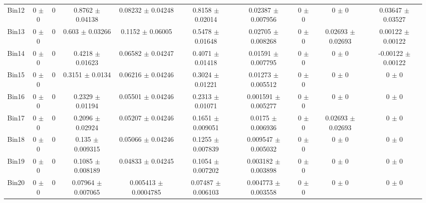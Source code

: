 \begin{tabular}{@{\extracolsep{4pt}}lccccccccc@{}}
     Bin12 & 0 $\pm$ 0 & 0 & 0.8762 $\pm$ 0.04138 & 0.08232 $\pm$ 0.04248 & 0.8158 $\pm$ 0.02014 & 0.02387 $\pm$ 0.007956 & 0 $\pm$ 0 & 0 $\pm$ 0 & 0.03647 $\pm$ 0.03527 \\ 
     Bin13 & 0 $\pm$ 0 & 0 & 0.603 $\pm$ 0.03266 & 0.1152 $\pm$ 0.06005 & 0.5478 $\pm$ 0.01648 & 0.02705 $\pm$ 0.008268 & 0 $\pm$ 0 & 0.02693 $\pm$ 0.02693 & 0.00122 $\pm$ 0.00122 \\ 
     Bin14 & 0 $\pm$ 0 & 0 & 0.4218 $\pm$ 0.01623 & 0.06582 $\pm$ 0.04247 & 0.4071 $\pm$ 0.01418 & 0.01591 $\pm$ 0.007795 & 0 $\pm$ 0 & 0 $\pm$ 0 & -0.00122 $\pm$ 0.00122 \\ 
     Bin15 & 0 $\pm$ 0 & 0 & 0.3151 $\pm$ 0.0134 & 0.06216 $\pm$ 0.04246 & 0.3024 $\pm$ 0.01221 & 0.01273 $\pm$ 0.005512 & 0 $\pm$ 0 & 0 $\pm$ 0 & 0 $\pm$ 0 \\ 
     Bin16 & 0 $\pm$ 0 & 0 & 0.2329 $\pm$ 0.01194 & 0.05501 $\pm$ 0.04246 & 0.2313 $\pm$ 0.01071 & 0.001591 $\pm$ 0.005277 & 0 $\pm$ 0 & 0 $\pm$ 0 & 0 $\pm$ 0 \\ 
     Bin17 & 0 $\pm$ 0 & 0 & 0.2096 $\pm$ 0.02924 & 0.05207 $\pm$ 0.04246 & 0.1651 $\pm$ 0.009051 & 0.0175 $\pm$ 0.006936 & 0 $\pm$ 0 & 0.02693 $\pm$ 0.02693 & 0 $\pm$ 0 \\ 
     Bin18 & 0 $\pm$ 0 & 0 & 0.135 $\pm$ 0.009315 & 0.05066 $\pm$ 0.04246 & 0.1255 $\pm$ 0.007839 & 0.009547 $\pm$ 0.005032 & 0 $\pm$ 0 & 0 $\pm$ 0 & 0 $\pm$ 0 \\ 
     Bin19 & 0 $\pm$ 0 & 0 & 0.1085 $\pm$ 0.008189 & 0.04833 $\pm$ 0.04245 & 0.1054 $\pm$ 0.007202 & 0.003182 $\pm$ 0.003898 & 0 $\pm$ 0 & 0 $\pm$ 0 & 0 $\pm$ 0 \\ 
     Bin20 & 0 $\pm$ 0 & 0 & 0.07964 $\pm$ 0.007065 & 0.005413 $\pm$ 0.0004785 & 0.07487 $\pm$ 0.006103 & 0.004773 $\pm$ 0.003558 & 0 $\pm$ 0 & 0 $\pm$ 0 & 0 $\pm$ 0 \\ 
\hline\hline
  \end{tabular}
